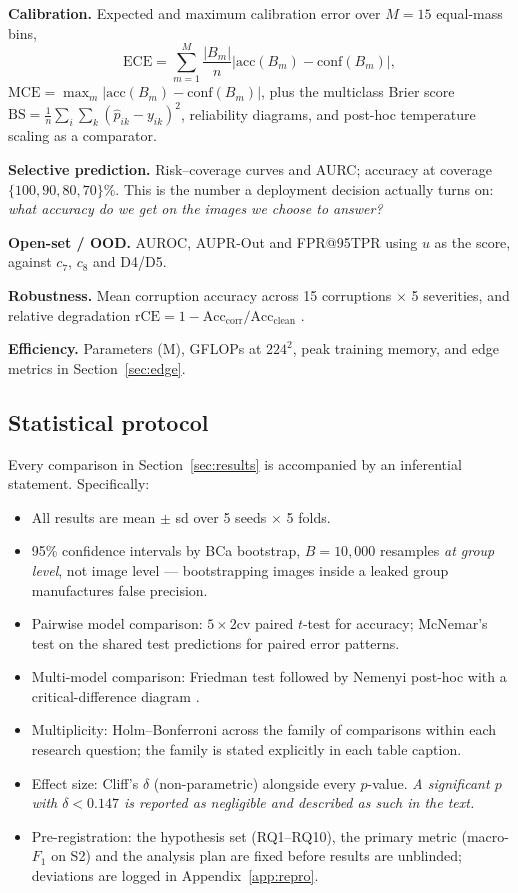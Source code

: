 \documentclass[10pt,twocolumn,a4paper]{article}
\begin{document}
\textbf{Calibration.} Expected and maximum calibration error over $M=15$ equal-mass bins,
\begin{equation}
\mathrm{ECE}=\sum_{m=1}^{M}\frac{|B_m|}{n}\Big|\mathrm{acc}(B_m)-\mathrm{conf}(B_m)\Big|,
\end{equation}
$\mathrm{MCE}=\max_m|\mathrm{acc}(B_m)-\mathrm{conf}(B_m)|$, plus the multiclass Brier score
$\mathrm{BS}=\frac{1}{n}\sum_i\sum_k(\hat{p}_{ik}-y_{ik})^2$, reliability diagrams, and post-hoc temperature scaling as a comparator.

\textbf{Selective prediction.} Risk--coverage curves and AURC; accuracy at coverage $\{100,90,80,70\}$\%. This is the number a deployment decision actually turns on: \emph{what accuracy do we get on the images we choose to answer?}

\textbf{Open-set / OOD.} AUROC, AUPR-Out and FPR@95TPR using $u$ as the score, against $c_7$, $c_8$ and D4/D5.

\textbf{Robustness.} Mean corruption accuracy across 15 corruptions $\times$ 5 severities, and relative degradation $\mathrm{rCE}=1-\mathrm{Acc}_{\text{corr}}/\mathrm{Acc}_{\text{clean}}$ \cite{hendrycks2019}.

\textbf{Efficiency.} Parameters (M), GFLOPs at $224^2$, peak training memory, and edge metrics in Section~\ref{sec:edge}.

\subsection{Statistical protocol}
\label{sec:stats}
Every comparison in Section~\ref{sec:results} is accompanied by an inferential statement. Specifically:
\begin{itemize}[leftmargin=1.1em,itemsep=1pt,topsep=2pt]
\item All results are mean $\pm$ sd over 5 seeds $\times$ 5 folds.
\item 95\% confidence intervals by BCa bootstrap, $B=10{,}000$ resamples \emph{at group level}, not image level --- bootstrapping images inside a leaked group manufactures false precision.
\item Pairwise model comparison: $5\times2$cv paired $t$-test \cite{dietterich1998} for accuracy; McNemar's test on the shared test predictions for paired error patterns.
\item Multi-model comparison: Friedman test followed by Nemenyi post-hoc with a critical-difference diagram \cite{demsar2006}.
\item Multiplicity: Holm--Bonferroni across the family of comparisons within each research question; the family is stated explicitly in each table caption.
\item Effect size: Cliff's $\delta$ (non-parametric) alongside every $p$-value. \emph{A significant $p$ with $\delta<0.147$ is reported as negligible and described as such in the text.}
\item Pre-registration: the hypothesis set (RQ1--RQ10), the primary metric (macro-$F_1$ on S2) and the analysis plan are fixed before results are unblinded; deviations are logged in Appendix~\ref{app:repro}.
\end{itemize}
\end{document}
